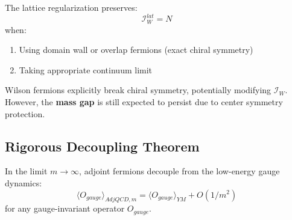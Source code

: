 \begin{theorem}
\label{thm:lattice-witten}
The lattice regularization preserves:
\begin{equation}
\mathcal{I}_W^{lat} = N
\end{equation}
when:
\begin{enumerate}
\item Using domain wall or overlap fermions (exact chiral symmetry)
\item Taking appropriate continuum limit
\end{enumerate}
\end{theorem}

\begin{remark}
Wilson fermions explicitly break chiral symmetry, potentially modifying 
$\mathcal{I}_W$. However, the \textbf{mass gap} is still expected to persist 
due to center symmetry protection.
\end{remark}

\subsection{Rigorous Decoupling Theorem}

\begin{theorem}
\label{thm:decoupling-rigorous}
In the limit $m \to \infty$, adjoint fermions decouple from the low-energy 
gauge dynamics:
\begin{equation}
\langle O_{gauge} \rangle_{AdjQCD,m} = \langle O_{gauge} \rangle_{YM} + O(1/m^2)
\end{equation}
for any gauge-invariant operator $O_{gauge}$.
\end{theorem}

